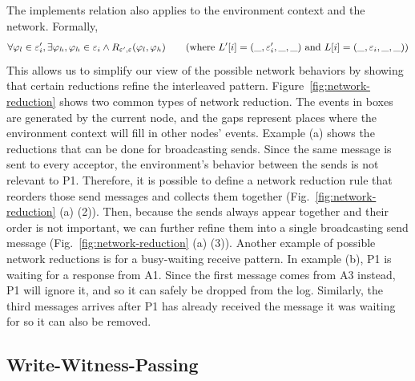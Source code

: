 
The implements relation also applies to the environment context and the network.
Formally,
$$\forall \varphi_l \in \envcontext'_i, \exists \varphi_h,  \varphi_h \in \envcontext_i \wedge R_{\envcontext', \envcontext}(\varphi_l , \varphi_h) \ \ \ \ \ \ (\mbox{where} \ L'[i] = (\_,  \envcontext'_i, \_, \_) \ \mbox{and} \
L[i] = (\_,  \envcontext_i, \_, \_))$$
This allows us to simplify our view of the possible network behaviors by showing that certain reductions refine the interleaved pattern.
Figure~\ref{fig:network-reduction} shows two common types of network reduction.
The events in boxes are generated by the current node, and the gaps represent places where the environment context will fill in other nodes' events.
Example (a) shows the reductions that can be done for broadcasting sends.
Since the same message is sent to every acceptor, the environment's behavior between the sends is not relevant to P1.
Therefore, it is possible to define a network reduction rule that reorders those send messages and collects them together (Fig.~\ref{fig:network-reduction} (a) (2)).
Then, because the sends always appear together and their order is not important, we can further refine them into a single broadcasting send message (Fig.~\ref{fig:network-reduction} (a) (3)).
Another example of possible network reductions is for a busy-waiting receive pattern.
In example (b), P1 is waiting for a response from A1.
Since the first message comes from A3 instead, P1 will ignore it, and so it can safely be dropped from the log.
Similarly, the third messages arrives after P1 has already received the message it was waiting for so it can also be removed.



\subsection{Write-Witness-Passing}
\label{subsec:witness-write}
\newcommand{\witness}{\varpi}


